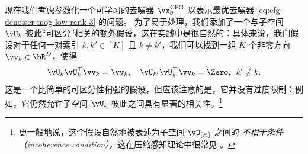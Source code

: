 \documentclass[../../book-main_zh.tex]{subfiles}
\begin{document}
\begin{example}

    现在我们考虑参数化一个可学习的去噪器 $\vx_{\theta}^{\mathrm{CFG}}$ 以表示最优去噪器 \eqref{eq:cfg-denoiser-mog-low-rank-3} 的问题。
    为了易于处理，我们添加了一个与子空间 $\vU_k$ 彼此“可区分”相关的额外假设，这在实践中是很自然的：具体来说，我们假设对于任何一对索引 $k, k' \in [K]$ 且 $k \neq k'$，我们可以找到一组 $K$ 个非零方向 $\vv_{k} \in \bR^D$，使得
    \begin{equation}
        \vU_{k}\vU_{k}^\top \vv_k = \vv_k, \quad
        \vU_{k'}\vU_{k'}^\top \vv_k = \Zero, \enspace k' \neq k.
    \end{equation}
    这是一个比简单的可区分性稍强的假设，但应该注意的是，它并没有过度限制：例如，它仍然允许子空间 $\vU_{k}$ 彼此之间具有显著的相关性。\footnote{更一般地说，这个假设自然地被表述为子空间 $\vU_{[K]}$ 之间的 \textit{不相干条件（incoherence condition）}，这在压缩感知理论中很常见 \cite{Wright-Ma-2022}。}


\end{example}
\end{document}
